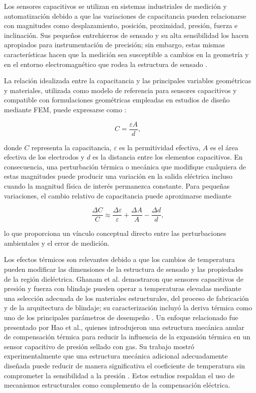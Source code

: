 \documentclass[conference]{IEEEtran}
\begin{document}
Los sensores capacitivos se utilizan en sistemas industriales de medición y automatización debido a que las variaciones de capacitancia pueden relacionarse con magnitudes como desplazamiento, posición, proximidad, presión, fuerza e inclinación. Sus pequeños entrehierros de sensado y su alta sensibilidad los hacen apropiados para instrumentación de precisión; sin embargo, estas mismas características hacen que la medición sea susceptible a cambios en la geometría y en el entorno electromagnético que rodea la estructura de sensado \cite{Ghanam2023,Zhang2024,Zaitsev2022}.

La relación idealizada entre la capacitancia y las principales variables geométricas y materiales, utilizada como modelo de referencia para sensores capacitivos y compatible con formulaciones geométricas empleadas en estudios de diseño mediante FEM, puede expresarse como \cite{Keshyagol2024,Ghanam2023}:

\begin{equation}
C=\frac{\varepsilon A}{d},
\label{eq:capacitance}
\end{equation}

donde $C$ representa la capacitancia, $\varepsilon$ es la permitividad efectiva, $A$ es el área efectiva de los electrodos y $d$ es la distancia entre los elementos capacitivos. En consecuencia, una perturbación térmica o mecánica que modifique cualquiera de estas magnitudes puede producir una variación en la salida eléctrica incluso cuando la magnitud física de interés permanezca constante. Para pequeñas variaciones, el cambio relativo de capacitancia puede aproximarse mediante

\begin{equation}
\frac{\Delta C}{C}\approx\frac{\Delta\varepsilon}{\varepsilon}+\frac{\Delta A}{A}-\frac{\Delta d}{d},
\label{eq:small_signal}
\end{equation}

lo que proporciona un vínculo conceptual directo entre las perturbaciones ambientales y el error de medición.

Los efectos térmicos son relevantes debido a que los cambios de temperatura pueden modificar las dimensiones de la estructura de sensado y las propiedades de la región dieléctrica. Ghanam et al. demostraron que sensores capacitivos de presión y fuerza con blindaje pueden operar a temperaturas elevadas mediante una selección adecuada de los materiales estructurales, del proceso de fabricación y de la arquitectura de blindaje; su caracterización incluyó la deriva térmica como uno de los principales parámetros de desempeño \cite{Ghanam2023}. Un enfoque relacionado fue presentado por Hao et al., quienes introdujeron una estructura mecánica anular de compensación térmica para reducir la influencia de la expansión térmica en un sensor capacitivo de presión sellado con gas. Su trabajo mostró experimentalmente que una estructura mecánica adicional adecuadamente diseñada puede reducir de manera significativa el coeficiente de temperatura sin comprometer la sensibilidad a la presión \cite{Hao2012}. Estos estudios respaldan el uso de mecanismos estructurales como complemento de la compensación eléctrica.
\end{document}
